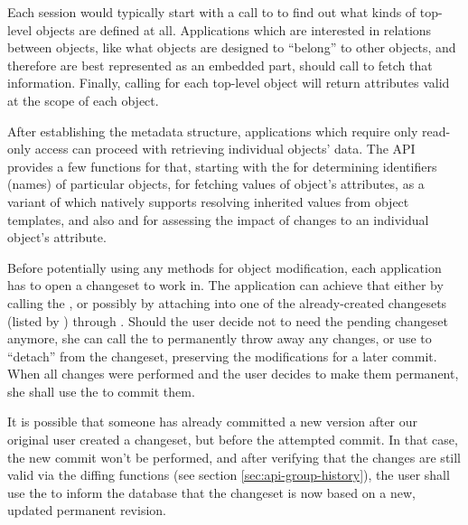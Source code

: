 \documentclass{article}
\begin{document}
Each session would typically start with a call to  to find out what kinds of top-level objects
are defined at all.  Applications which are interested in relations between objects, like what objects are designed to
``belong'' to other objects, and therefore are best represented as an embedded part, should call
 to fetch that information.  Finally, calling  for each
top-level object will return attributes valid at the scope of each object.

After establishing the metadata structure, applications which require only read-only access can proceed with retrieving
individual objects' data.  The API provides a few functions for that, starting with the  for
determining identifiers (names) of particular objects,  for fetching values of object's
attributes,  as a variant of  which natively supports
resolving inherited values from object templates, and also  and
 for assessing the impact of changes to an individual object's attribute.

Before potentially using any methods for object modification, each application has to open a changeset to work in.  The
application can achieve that either by calling the , or possibly by attaching into one of
the already-created changesets (listed by ) through .
Should the user decide not to need the pending changeset anymore, she can call the 
to permanently throw away any changes, or use  to ``detach'' from the
changeset, preserving the modifications for a later commit.  When all changes were performed and the user decides to
make them permanent, she shall use the  to commit them.

It is possible that someone has already committed a new version after our original user created a changeset, but before
the attempted commit.  In that case, the new commit won't be performed, and after verifying that the changes are still
valid via the diffing functions (see section \ref{sec:api-group-history}), the user shall use the
 to inform the database that the changeset is now based on a new, updated permanent
revision.
\end{document}
